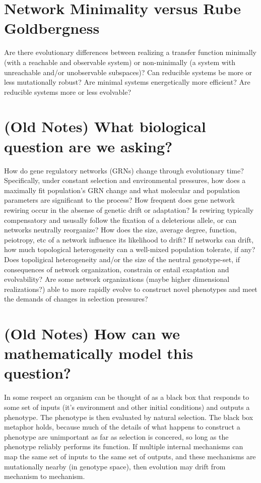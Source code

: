 \documentclass[11 pt]{article}
\begin{document}
\section{Network Minimality versus Rube Goldbergness}

Are there evolutionary differences between realizing a transfer function minimally (with a reachable and observable system) or non-minimally (a system with unreachable and/or unobservable subspaces)? Can reducible systems be more or less mutationally robust? Are minimal systems energetically more efficient? Are reducible systems more or less evolvable? 

\section{(Old Notes) What biological question are we asking?}

How do gene regulatory networks (GRNs) change through evolutionary time?
Specifically, under constant selection and environmental pressures, how does a
maximally fit population's GRN change and what molecular and population
parameters are significant to the process? How frequent does gene network
rewiring occur in the absense of genetic drift or adaptation? Is rewiring
typically compensatory and ususally follow the fixation of a deleterious
allele, or can networks neutrally reorganize? How does the size, average
degree, function, peiotropy, etc of a network influence its likelihood to
drift? If networks can drift, how much topological heterogeneity can a
well-mixed population tolerate, if any? Does topoligical heterogeneity and/or
the size of the neutral genotype-set, if consequences of network organization,
constrain or entail exaptation and evolvability? Are some network organizations
(maybe higher dimensional realizations?) able to more rapidly evolve to
construct novel phenotypes and meet the demands of changes in selection
pressures?

\section{(Old Notes) How can we mathematically model this question?}

In some respect an organism can be thought of as a black box that responds to
some set of inputs (it's environment and other initial conditions) and outputs
a phenotype. The phenotype is then evaluated by natural selection. The black
box metaphor holds, because much of the details of what happens to construct a
phenotype are unimportant as far as selection is concered, so long as the
phenotype reliably performs its function. If multiple internal mechanisms can
map the same set of inputs to the same set of outputs, and these mechanisms are
mutationally nearby (in genotype space), then evolution may drift from
mechanism to mechanism. 
\end{document}
